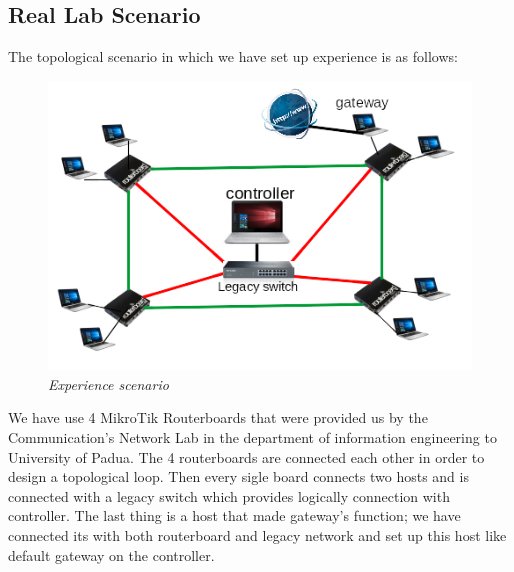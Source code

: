 \documentclass[article,10pt]{IEEEtran}
\begin{document}
\subsection{Real Lab Scenario}
The topological scenario in which we have set up experience is as follows:
\begin{figure}[!h]
 \centering
 \includegraphics[scale=0.70]{images/topo.png}
 \caption{\emph{Experience scenario}}
 \label{fig:topo}
\end{figure}

We have use 4 MikroTik Routerboards that were provided us by the Communication's Network Lab in the department of information  engineering to 
University of Padua.
The 4 routerboards are connected each other in order to design a topological loop. Then every sigle board connects two hosts and is connected with a 
legacy switch which provides logically connection with controller.
The last thing is a host that made gateway's function; we have connected its with both routerboard and legacy network and set up this host like default 
gateway on the controller.
\end{document}
